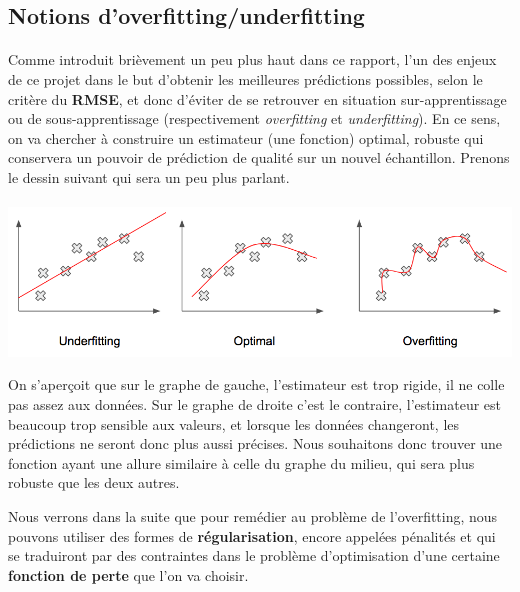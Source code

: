 \documentclass[14pt, openany]{article}
\begin{document}
\subsection{Notions d'overfitting/underfitting}
\paragraph{}
Comme introduit brièvement un peu plus haut dans ce rapport, l'un des enjeux de ce projet dans le but d'obtenir les meilleures prédictions possibles, selon le critère du \textbf{RMSE}, et donc d'éviter de se retrouver en situation sur-apprentissage ou de sous-apprentissage (respectivement \textit{overfitting} et \textit{underfitting}). En ce sens, on va chercher à construire un estimateur (une fonction) optimal, robuste qui conservera un pouvoir de prédiction de qualité sur un nouvel échantillon. Prenons le dessin suivant qui sera un peu plus parlant.
\paragraph{}
\includegraphics[width=17cm]{Images/overfitting.png}
\begin{center}
\label{fig1}
\end{center}
On s'aperçoit que sur le graphe de gauche, l'estimateur est trop rigide, il ne \og colle \fg{} pas assez aux données. Sur le graphe de droite c'est le contraire, l'estimateur est beaucoup trop sensible aux valeurs, et lorsque les données changeront, les prédictions ne seront donc plus aussi précises. Nous souhaitons donc trouver une fonction ayant une allure similaire à celle du graphe du milieu, qui sera plus \og robuste \fg{} que les deux autres.


Nous verrons dans la suite que pour remédier au problème de l'overfitting, nous pouvons utiliser des formes de \textbf{régularisation}, encore appelées pénalités et qui se traduiront par des contraintes dans le problème d'optimisation d'une certaine \textbf{fonction de perte} que l'on va choisir.\\
\end{document}
